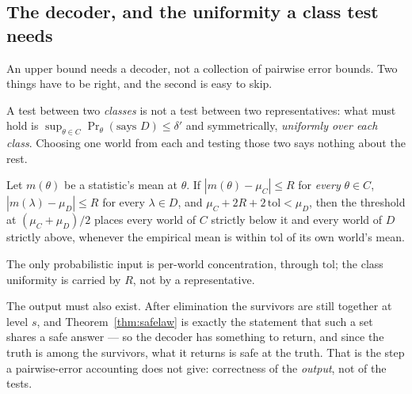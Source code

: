 

\subsection{The decoder, and the uniformity a class test needs}
\label{sec:decoder}

An upper bound needs a decoder, not a collection of pairwise error bounds. Two things have to
be right, and the second is easy to skip.

A test between two \emph{classes} is not a test between two representatives: what must hold
is $\sup_{\theta\in C}\Pr_{\theta}(\text{says }D)\le\delta'$ and symmetrically,
\emph{uniformly over each class}. Choosing one world from each and testing those two says
nothing about the rest.

\begin{theorem}
\label{thm:composite}
Let $m(\theta)$ be a statistic's mean at $\theta$. If $|m(\theta)-\mu_{C}|\le R$ for
\emph{every} $\theta\in C$, $|m(\lambda)-\mu_{D}|\le R$ for every $\lambda\in D$, and
$\mu_{C}+2R+2\,\mathrm{tol}<\mu_{D}$, then the threshold at $(\mu_{C}+\mu_{D})/2$ places
every world of $C$ strictly below it and every world of $D$ strictly above, whenever the
empirical mean is within $\mathrm{tol}$ of its own world's mean.
\end{theorem}

The only probabilistic input is per-world concentration, through $\mathrm{tol}$; the class
uniformity is carried by $R$, not by a representative.

The output must also exist. After elimination the survivors are still together at level $s$,
and Theorem~\ref{thm:safelaw} is exactly the statement that such a set shares a safe answer
--- so the decoder has something to return, and since the truth is among the survivors, what
it returns is safe at the truth. That is the step a pairwise-error accounting does not give:
correctness of the \emph{output}, not of the tests.

